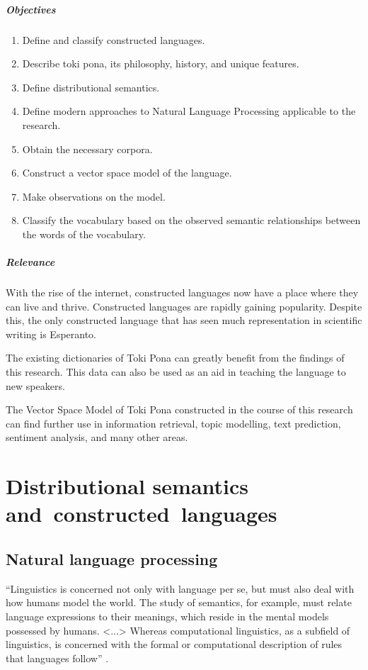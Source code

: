 \documentclass[14pt, a4paper]{extreport}
\begin{document}
\paragraph{Objectives}

\begin{enumerate}
  \item Define and classify constructed languages.
  \item Describe toki pona, its philosophy, history, and unique features.
  \item Define distributional semantics.
  \item Define modern approaches to Natural Language Processing applicable to the research.
  \item Obtain the necessary corpora.
  \item Construct a vector space model of the language.
  \item Make observations on the model.
  \item Classify the vocabulary based on the observed semantic relationships between the words of the vocabulary.
\end{enumerate}


\paragraph{Relevance}

With the rise of the internet, constructed languages now have a place where they can live and thrive. Constructed languages are rapidly gaining popularity. Despite this, the only constructed language that has seen much representation in scientific writing is Esperanto.

The existing dictionaries of Toki Pona can greatly benefit from the findings of this research. This data can also be used as an aid in teaching the language to new speakers.

The Vector Space Model of Toki Pona constructed in the course of this research can find further use in information retrieval, topic modelling, text prediction, sentiment analysis, and many other areas.


\chapter{Distributional semantics and~constructed~languages}

\section{Natural language processing}
``Linguistics is concerned not only with language per se, but must also deal with how humans model the world. The study of semantics, for example, must relate language expressions to their meanings, which reside in the mental models possessed by humans. <...> Whereas computational linguistics, as a subfield of linguistics, is concerned with the formal or computational description of rules that languages follow'' \parencite{nlpandcl}.
\end{document}
